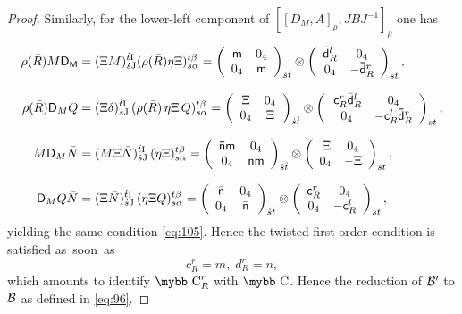 \documentclass[11pt]{article}
\def\bb#1{\hbox{\mybb#1}}
\newcommand{\sI}{\mathrm  I}
\newcommand{\sJ}{\mathrm J}
\begin{document}
\begin{proof}
Similarly, for the lower-left component of $[[D_M, A]_\rho, JBJ^{-1}]_\rho$ one has
\begin{align}
  \label{eq:102bis}
 \rho(\bar R) M \sf D_M & =(\Xi M)_{\dot s \sJ}^{\dot t \sI}
 (\rho(\bar R) \eta\Xi)_{s\alpha}^{t\beta} = \left(\begin{array}{cc}  \sf m  & 0_4 \\ 0_4 &\sf m 
    \end{array}\right)_{\dot s \dot t}\otimes\left(\begin{array}{cc}
      {\sf \bar d}^l_R& 0_4 \\0_4 &-{\sf \bar d}^r_R\end{array}\right)_{st},\\[7.5pt]
 \rho(\bar R){\sf D}_M Q&= (\Xi\delta)_{\dot  s\sJ}^{\dot t\sI}\,(\rho(\bar R)\,\eta\Xi \, Q)_{s\alpha}^{t\beta} = \left(\begin{array}{cc}  \Xi& 0_4 \\ 0_4 &\Xi\end{array}\right)_{\dot s \dot t}\otimes\left(\begin{array}{cc}
  \,{\sf c}^r_R \bar{\sf  d}^l_R& 0_4 \\0_4 &-{\sf c}^l_R{\sf \bar d}^r_R\end{array}\right)_{st},\\[7.5pt] 
M{\sf D}_M \bar N &=  (M\Xi\bar N)_ {\dot s\sJ}^{\dot t\sI}\,(\eta\Xi)_{s\alpha}^{t\beta} = \left(\begin{array}{cc} \sf \bar n \sf m& 0_4 \\0_4 & \sf \bar n\sf m
    \end{array}\right)_{\dot s \dot t}\otimes\left(\begin{array}{cc}
      \,\Xi& 0_4 \\0_4 & -\Xi\end{array}\right)_{st},\\[7.5pt]
{\sf D}_M Q\bar N&=(\Xi \bar N)_{\dot s\sJ}^{\dot t\sI}  \,
(\eta \Xi Q)_{s\alpha}^{t\beta} = \left(\begin{array}{cc} \bar{\sf
      n}& 0_4 \\0_4 & \bar{\sf n}  \end{array}\right)_{\dot s \dot
  t}\otimes\left(\begin{array}{cc}{\sf c}^r_R& 0_4 \\0_4 &
    -{\sf c}^l_R\end{array}\right)_{st},
\end{align}
yielding the same condition
\eqref{eq:105}. Hence the twisted first-order condition is satisfied
as~soon~as
\begin{equation}
c^r_R =m,\; d^r_R=n,
\label{eq:8}
\end{equation}
which amounts to
identify $\bb C^r_R$ with $\bb C$. Hence the reduction of $\cal B'$ to
$\cal B$ as defined in \eqref{eq:96}. 
\end{proof}
\end{document}
